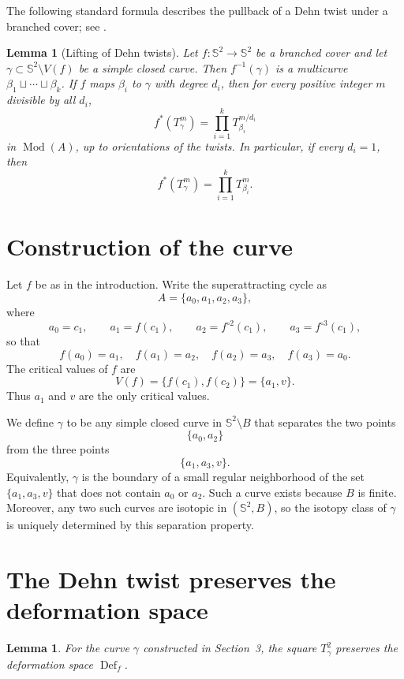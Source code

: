 \documentclass[12pt]{article}
\newtheorem{lemma}[theorem]{Lemma}
\theoremstyle{definition}
\newcommand{\Sph}{\mathbb{S}^2}
\newcommand{\Mod}{\operatorname{Mod}}
\newcommand{\Def}{\operatorname{Def}}
\begin{document}
The following standard formula describes the pullback of a Dehn twist under a branched cover; see \cite[Lemma~2.1]{BE}.

\begin{lemma}[Lifting of Dehn twists]\label{lem:lift}
Let \(f:\Sph\to\Sph\) be a branched cover and let \(\gamma\subset\Sph\setminus V(f)\) be a simple closed curve. Then \(f^{-1}(\gamma)\) is a multicurve \(\beta_1\sqcup\cdots\sqcup\beta_k\). If \(f\) maps \(\beta_i\) to \(\gamma\) with degree \(d_i\), then for every positive integer \(m\) divisible by all \(d_i\),
\[
f^*(T_\gamma^m)=\prod_{i=1}^k T_{\beta_i}^{m/d_i}
\]
in \(\Mod(A)\), up to orientations of the twists. In particular, if every \(d_i=1\), then
\[
f^*(T_\gamma^m)=\prod_{i=1}^k T_{\beta_i}^m .
\]
\end{lemma}

\section{Construction of the curve}

Let \(f\) be as in the introduction. Write the superattracting cycle as
\[
A=\{a_0,a_1,a_2,a_3\},
\]
where
\[
a_0=c_1,\qquad a_1=f(c_1),\qquad a_2=f^{\circ 2}(c_1),\qquad a_3=f^{\circ 3}(c_1),
\]
so that
\[
f(a_0)=a_1,\quad f(a_1)=a_2,\quad f(a_2)=a_3,\quad f(a_3)=a_0.
\]
The critical values of \(f\) are
\[
V(f)=\{f(c_1),f(c_2)\}=\{a_1,v\}.
\]
Thus \(a_1\) and \(v\) are the only critical values.

We define \(\gamma\) to be any simple closed curve in \(\Sph\setminus B\) that separates the two points
\[
\{a_0,a_2\}
\]
from the three points
\[
\{a_1,a_3,v\}.
\]
Equivalently, \(\gamma\) is the boundary of a small regular neighborhood of the set \(\{a_1,a_3,v\}\) that does not contain \(a_0\) or \(a_2\). Such a curve exists because \(B\) is finite. Moreover, any two such curves are isotopic in \((\Sph,B)\), so the isotopy class of \(\gamma\) is uniquely determined by this separation property.

\section{The Dehn twist preserves the deformation space}

\begin{lemma}\label{lem:preserve}
For the curve \(\gamma\) constructed in Section~3, the square \(T_\gamma^2\) preserves the deformation space \(\Def_f\).
\end{lemma}
\end{document}
